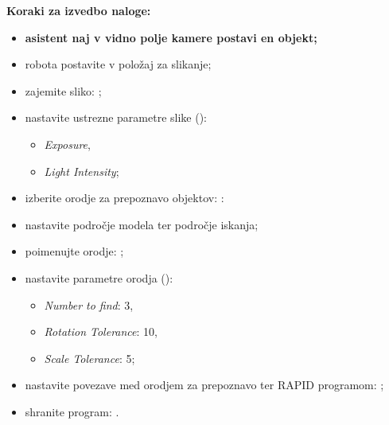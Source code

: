 \begin{mdframed}[backgroundcolor=yellow!20, shadow=true,roundcorner=8pt]
\textbf{Koraki za izvedbo naloge:}
\end{mdframed} 
\begin{mdframed}[backgroundcolor=red!20, shadow=true,roundcorner=8pt]
    \begin{itemize}
      \item \textbf{asistent naj v vidno polje kamere postavi en objekt;}
    \end{itemize}
\end{mdframed} 
\begin{mdframed}[backgroundcolor=yellow!20, shadow=true,roundcorner=8pt]
\begin{itemize}
              \item robota postavite v položaj za slikanje;
              \item zajemite sliko: ;
              \item nastavite ustrezne parametre slike ():
              \begin{itemize}
                \item \emph{Exposure},
                \item \emph{Light Intensity};
              \end{itemize}
              \item izberite orodje za prepoznavo objektov: :
              \item nastavite področje modela ter področje iskanja;
              \item poimenujte orodje: ;
              \item nastavite parametre orodja ():
              \begin{itemize}
                \item \emph{Number to find}: 3,
                \item \emph{Rotation Tolerance}: 10,
                \item \emph{Scale Tolerance}: 5;
              \end{itemize}
              \item nastavite povezave med orodjem za prepoznavo ter RAPID programom: ;
              \item shranite program: .
\end{itemize}
\end{mdframed}



